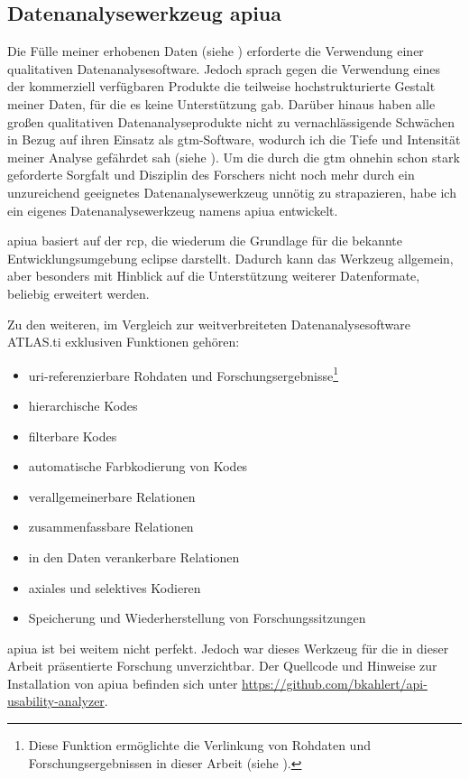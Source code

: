 \subsection{Datenanalysewerkzeug \acrlong{apiua}}
Die Fülle meiner erhobenen Daten (siehe ) erforderte die Verwendung einer qualitativen Datenanalysesoftware. Jedoch sprach gegen die Verwendung eines der kommerziell verfügbaren Produkte die teilweise hochstrukturierte Gestalt meiner Daten, für die es keine Unterstützung gab. Darüber hinaus haben alle großen qualitativen Datenanalyseprodukte nicht zu vernachlässigende Schwächen in Bezug auf ihren Einsatz als \gls{gtm}-Software, wodurch ich die Tiefe und Intensität meiner Analyse gefährdet sah (siehe ). Um die durch die \gls{gtm} ohnehin schon stark geforderte Sorgfalt und Disziplin des Forschers nicht noch mehr durch ein unzureichend geeignetes Datenanalysewerkzeug unnötig zu strapazieren, habe ich ein eigenes Datenanalysewerkzeug namens \acrfull{apiua} entwickelt.

\Gls{apiua} basiert auf der \gls{rcp}, die wiederum die Grundlage für die bekannte Entwicklungsumgebung \gls{eclipse} darstellt. Dadurch kann das Werkzeug allgemein, aber besonders mit Hinblick auf die Unterstützung weiterer Datenformate, beliebig erweitert werden.

Zu den weiteren, im Vergleich zur weitverbreiteten Datenanalysesoftware ATLAS.ti exklusiven Funktionen gehören:
\begin{itemize}
\itemsep1pt\parskip0pt
  \item \acrshort{uri}-referenzierbare Rohdaten und Forschungsergebnisse\footnote{Diese Funktion ermöglichte die Verlinkung von Rohdaten und Forschungsergebnissen in dieser Arbeit (siehe ).}
  \item hierarchische Kodes
  \item filterbare Kodes
  \item automatische Farbkodierung von Kodes
  \item verallgemeinerbare Relationen
  \item zusammenfassbare Relationen
  \item in den Daten verankerbare Relationen
  \item axiales und selektives Kodieren
  \item Speicherung und Wiederherstellung von Forschungssitzungen
\end{itemize}

\gls{apiua} ist bei weitem nicht perfekt. Jedoch war dieses Werkzeug für die in dieser Arbeit präsentierte Forschung unverzichtbar. Der Quellcode und Hinweise zur Installation von \gls{apiua} befinden sich unter \url{https://github.com/bkahlert/api-usability-analyzer}.


